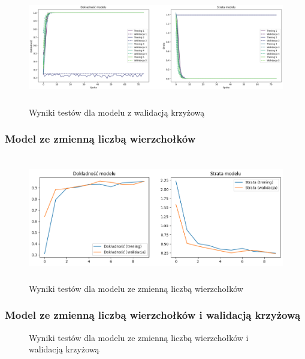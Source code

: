 \begin{figure}[ht]
	\centering
	\includegraphics[height=5cm]{partials/images/tests/v2_crossvalid.png}
	\caption{Wyniki testów dla modelu z walidacją krzyżową}
\label{Fig:GraphUndirected}
\end{figure}
\FloatBarrier

\subsubsection{Model ze zmienną liczbą wierzchołków}
\begin{figure}[ht]
	\centering
	\includegraphics[height=5.5cm]{partials/images/tests/v2_multiple_edges.png}
	\caption{Wyniki testów dla modelu ze zmienną liczbą wierzchołków}
\label{Fig:GraphUndirected}
\end{figure}
\FloatBarrier

\subsubsection{Model ze zmienną liczbą wierzchołków i walidacją krzyżową}

\begin{figure}[ht]
	\centering
	\caption{Wyniki testów dla modelu ze zmienną liczbą wierzchołków i walidacją krzyżową}
\label{Fig:GraphUndirected}
\end{figure}
\FloatBarrier

